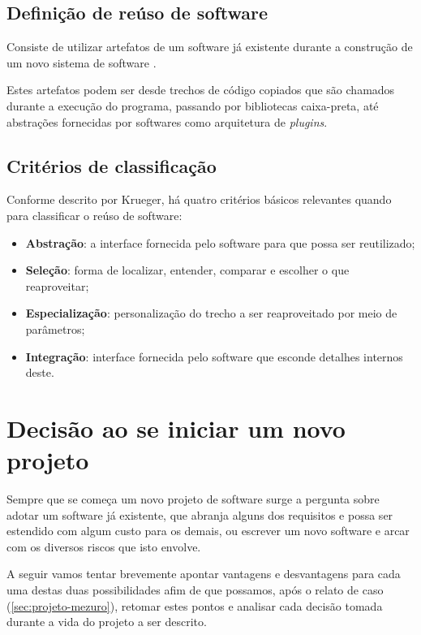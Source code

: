 \documentclass[12pt]{article}
\begin{document}
  \subsection{Definição de reúso de software} \label{subsec:definicaoreuso}
  Consiste de utilizar artefatos de um software já existente durante a construção de um novo sistema de software \cite{k92}.

  Estes artefatos podem ser desde trechos de código copiados que são chamados durante a execução do programa, passando por bibliotecas caixa-preta, até abstrações fornecidas por softwares como arquitetura de \textit{plugins}.

  \subsection{Critérios de classificação} \label{subsec:criteriosclassificacao}
  Conforme descrito por Krueger, há quatro critérios básicos relevantes quando para classificar o reúso de software:

  \begin{itemize}
    \item \textbf{Abstração}: a interface fornecida pelo software para que possa ser reutilizado;
    \item \textbf{Seleção}: forma de localizar, entender, comparar e escolher o que reaproveitar;
    \item \textbf{Especialização}: personalização do trecho a ser reaproveitado por meio de parâmetros;
    \item \textbf{Integração}: interface fornecida pelo software que esconde detalhes internos deste.
  \end{itemize}

\section{Decisão ao se iniciar um novo projeto} \label{sec:decisao}
Sempre que se começa um novo projeto de software surge a pergunta sobre adotar um software já existente, que abranja alguns dos requisitos e possa ser estendido com algum custo para os demais, ou escrever um novo software e arcar com os diversos riscos que isto envolve.

A seguir vamos tentar brevemente apontar vantagens e desvantagens para cada uma destas duas possibilidades afim de que possamos, após o relato de caso (\ref{sec:projeto-mezuro}), retomar estes pontos e analisar cada decisão tomada durante a vida do projeto a ser descrito.
\end{document}
